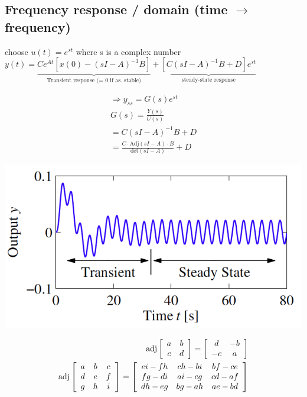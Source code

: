 \subsection{Frequency response / domain (time $\rightarrow$ frequency)}
choose $u(t) = e^{st}$ where s is a complex number\\
$ y(t) = \underbrace{Ce^{At} [x(0) - (sI - A)^{-1} B]}_{\text{Transient response (= 0 if as. stable)}}
+ \underbrace{[C(sI - A)^{-1} B + D]e^{st}}_{\text{steady-state response}}$\\
\begin{minipage}{0.39\linewidth}
    \begin{align*}
        \Rightarrow y_{ss} = G(s) e^{st}\\
    G(s) = \frac{Y(s)}{U(s)}\\
    = C(sI - A)^{-1} B + D\\
    = \frac{C \cdot \text{Adj}(sI - A) \cdot B}{\text{det}(sI - A)} + D
    \end{align*}
\end{minipage}
\begin{minipage}{0.59\linewidth}
    \includegraphics[width = \linewidth]{src/images/transient_steady_state.png}
\end{minipage}


\begin{align*}
    \text{adj}\left[
        \begin{array}{c c}
            a & b\\
            c & d            
        \end{array}
    \right]
    = \left[
        \begin{array}{c c}
            d & -b\\
            -c & a
        \end{array}
    \right]
    \\
    \text{adj}\left[
        \begin{array}{c c c}
            a & b & c\\
            d & e & f\\
            g & h & i
        \end{array}
    \right]
    = \left[
        \begin{array}{c c c}
            ei-fh & ch-bi & bf-ce\\
            fg-di & ai-cg & cd-af\\
            dh-eg & bg-ah & ae-bd            
        \end{array}
    \right]
\end{align*}